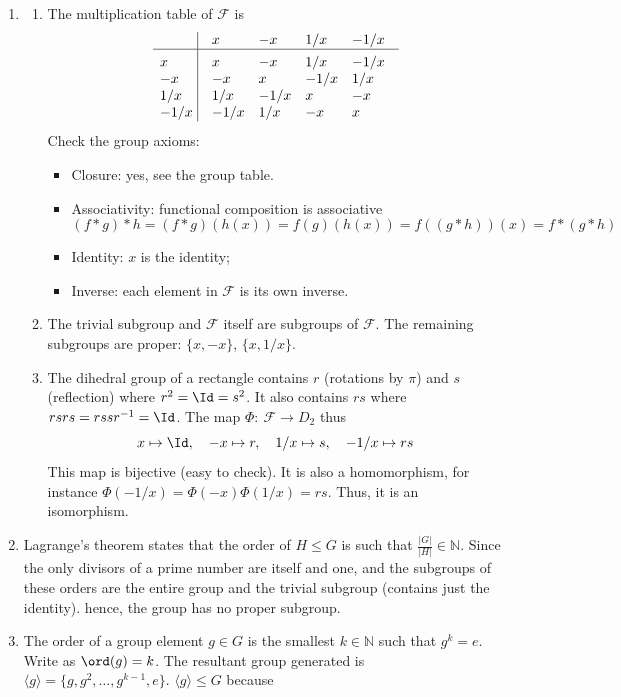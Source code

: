\documentclass[a4paper]{article}
\begin{document}
\newpage
\begin{ans}\leavevmode
\begin{enumerate}[label=(\roman*)]
\item 
\begin{enumerate}[label=(\alph*)]
\item The multiplication table of $\mathcal{F}$ is
$$\vbox{\tabskip0.5em\offinterlineskip
    \halign{\strut$#$\hfil\ \tabskip1em\vrule&&$#$\hfil\cr
    ~   & x & -x &1/x&-1/x \cr
    \noalign{\hrule}\vrule height 12pt width 0pt
    x & x & -x &1/x&-1/x \cr
    -x & -x & x &-1/x & 1/x \cr
    1/x & 1/x & -1/x & x &-x \cr
    -1/x & -1/x &1/x & -x & x\cr
}}$$
Check the group axioms:
\begin{itemize}
    \item Closure: yes, see the group table.
    \item Associativity: functional composition is associative
    $$(f*g)*h=(f*g)(h(x))=f(g)(h(x))=f((g*h))(x)=f*(g*h)$$
    \item Identity: $x$ is the identity;
    \item Inverse: each element in $\mathcal{F}$ is its own inverse.
\end{itemize}
\item The trivial subgroup and $\mathcal{F}$ itself are subgroups of $\mathcal{F}$. The remaining subgroups are proper: $\{x,-x\}$, $\{x,1/x\}$.
\item The dihedral group of a rectangle contains $r$ (rotations by $\pi$) and $s$ (reflection) where $r^2=\Id=s^2$. It also contains $rs$ where $rsrs=rssr^{-1}=\Id$. The map $\Phi:~\mathcal{F}\rightarrow D_2$ thus
$$x\mapsto\Id,\quad -x\mapsto r,\quad 1/x\mapsto s,\quad -1/x\mapsto rs$$
This map is bijective (easy to check). It is also a homomorphism, for instance $\Phi(-1/x)=\Phi(-x)\Phi(1/x)=rs$. Thus, it is an isomorphism.
\end{enumerate}
\item Lagrange's theorem states that the order of $H\leq G$ is such that $\frac{|G|}{|H|}\in\mathbb{N}$. Since the only divisors of a prime number are itself and one, and the subgroups of these orders are the entire group and the trivial subgroup (contains just the identity). hence, the group has no proper subgroup.
\item The order of a group element $g\in G$ is the smallest $k\in\mathbb{N}$ such that $g^k=e$. Write as $\ord(g)=k$. The resultant group generated is $\langle g\rangle=\{g,g^2,\dots,g^{k-1},e\}$. $\langle g\rangle\leq G$ because
\begin{itemize}

\end{itemize}
\end{enumerate}
\end{ans}
\end{document}
